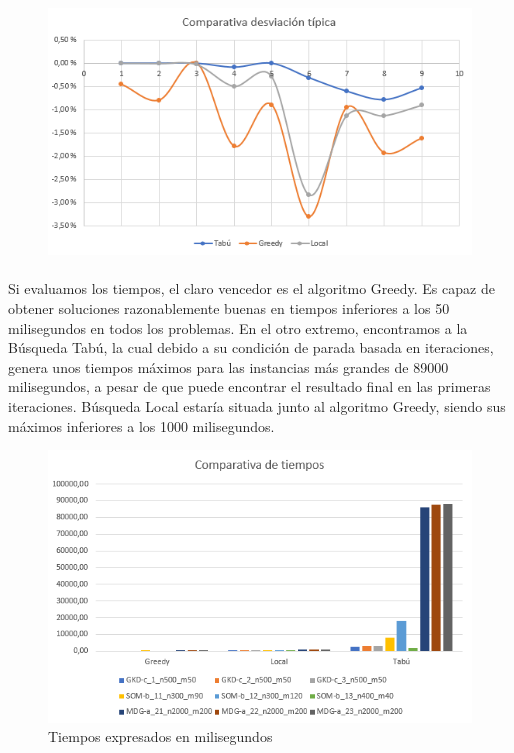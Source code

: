 \documentclass{article}
\begin{document}
			\begin{figure}[H]
				
				\centering
				\includegraphics[scale=0.4]{img/DTGlobal}
				
			\end{figure}
			
		\paragraph{}Si evaluamos los tiempos, el claro vencedor es el algoritmo Greedy. Es capaz de obtener soluciones razonablemente buenas en tiempos inferiores a los 50 milisegundos en todos los problemas. En el otro extremo, encontramos a la Búsqueda Tabú, la cual debido a su condición de parada basada en iteraciones, genera unos tiempos máximos para las instancias más grandes de 89000 milisegundos, a pesar de que puede encontrar el resultado final en las primeras iteraciones. Búsqueda Local estaría situada junto al algoritmo Greedy, siendo sus máximos inferiores a los 1000 milisegundos.
			
			\begin{figure}[H]
				
				\centering
				\includegraphics[scale=0.4]{img/TiemposGlobal}
				\caption{Tiempos expresados en milisegundos}
				
			\end{figure}
			
\end{document}
